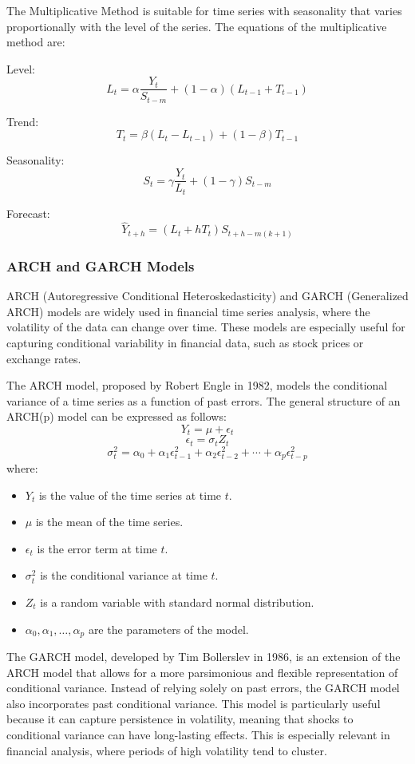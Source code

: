 The Multiplicative Method is suitable for time series with seasonality that varies proportionally with the level of the series. The equations of the multiplicative method are:

Level:
\[
L_t = \alpha \frac{Y_t}{S_{t-m}} + (1-\alpha)(L_{t-1} + T_{t-1})
\]

Trend:
\[
T_t = \beta (L_t - L_{t-1}) + (1-\beta) T_{t-1}
\]

Seasonality:
\[
S_t = \gamma \frac{Y_t}{L_t} + (1-\gamma) S_{t-m}
\]

Forecast:
\[
\hat{Y}_{t+h} = (L_t + h T_t) S_{t+h-m(k+1)}
\]

\subsubsection{ARCH and GARCH Models}

ARCH (Autoregressive Conditional Heteroskedasticity) and GARCH (Generalized ARCH) models are widely used in financial time series analysis, where the volatility of the data can change over time. These models are especially useful for capturing conditional variability in financial data, such as stock prices or exchange rates.

The ARCH model, proposed by Robert Engle in 1982, models the conditional variance of a time series as a function of past errors. The general structure of an ARCH(p) model can be expressed as follows:
\[
Y_t = \mu + \epsilon_t
\]
\[
\epsilon_t = \sigma_t Z_t
\]
\[
\sigma_t^2 = \alpha_0 + \alpha_1 \epsilon_{t-1}^2 + \alpha_2 \epsilon_{t-2}^2 + \cdots + \alpha_p \epsilon_{t-p}^2
\]
where:
\begin{itemize}
    \item \( Y_t \) is the value of the time series at time \( t \).
    \item \( \mu \) is the mean of the time series.
    \item \( \epsilon_t \) is the error term at time \( t \).
    \item \( \sigma_t^2 \) is the conditional variance at time \( t \).
    \item \( Z_t \) is a random variable with standard normal distribution.
    \item \( \alpha_0, \alpha_1, \ldots, \alpha_p \) are the parameters of the model.
\end{itemize}

The GARCH model, developed by Tim Bollerslev in 1986, is an extension of the ARCH model that allows for a more parsimonious and flexible representation of conditional variance. Instead of relying solely on past errors, the GARCH model also incorporates past conditional variance. This model is particularly useful because it can capture persistence in volatility, meaning that shocks to conditional variance can have long-lasting effects. This is especially relevant in financial analysis, where periods of high volatility tend to cluster.

